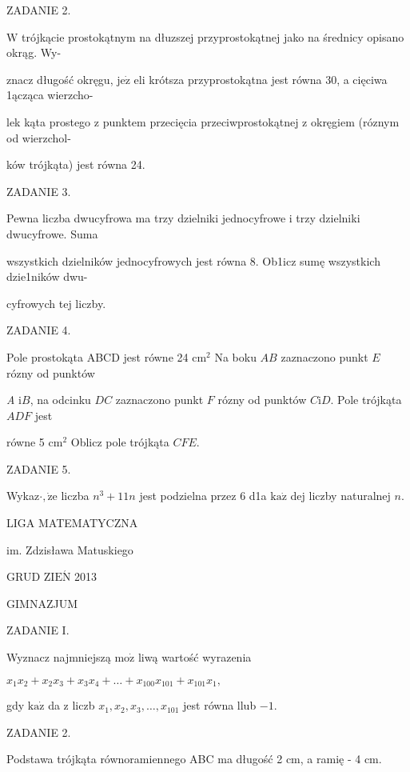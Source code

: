 \documentclass[a4paper,12pt]{article}
\begin{document}
ZADANIE 2.

$\mathrm{W}$ trójkącie prostokątnym na dłuzszej przyprostokątnej jako na średnicy opisano okrąg. Wy-

znacz długość okręgu, $\mathrm{j}\mathrm{e}\dot{\mathrm{z}}$ eli krótsza przyprostokątna jest równa 30, a cięciwa 1ącząca wierzcho-

lek kąta prostego z punktem przecięcia przeciwprostokątnej z okręgiem (róznym od wierzchol-

ków trójkąta) jest równa 24.

ZADANIE 3.

Pewna liczba dwucyfrowa ma trzy dzielniki jednocyfrowe i trzy dzielniki dwucyfrowe. Suma

wszystkich dzielników jednocyfrowych jest równa 8. Ob1icz sumę wszystkich dzie1ników dwu-

cyfrowych tej liczby.

ZADANIE 4.

Pole prostokąta ABCD jest równe 24 $\mathrm{c}\mathrm{m}^{2}$ Na boku $AB$ zaznaczono punkt $E$ rózny od punktów

{\it A} $\mathrm{i}B$, na odcinku $DC$ zaznaczono punkt $F$ rózny od punktów $C\mathrm{i}D$. Pole trójkąta $ADF$ jest

równe 5 $\mathrm{c}\mathrm{m}^{2}$ Oblicz pole trójkąta $CFE.$

ZADANIE 5.

Wykaz$\cdot, \dot{\mathrm{z}}\mathrm{e}$ liczba $n^{3}+11n$ jest podzielna przez 6 d1a $\mathrm{k}\mathrm{a}\dot{\mathrm{z}}$ dej liczby naturalnej $n.$






LIGA MATEMATYCZNA

im. Zdzisława Matuskiego

GRUD Z$\mathrm{I}\mathrm{E}\acute{\mathrm{N}}$ 2013

GIMNAZJUM

ZADANIE I.

Wyznacz najmniejszą $\mathrm{m}\mathrm{o}\dot{\mathrm{z}}$ liwą wartość wyrazenia

$x_{1}x_{2}+x_{2}x_{3}+x_{3}x_{4}+\ldots+x_{100}x_{101}+x_{101}x_{1},$

gdy $\mathrm{k}\mathrm{a}\dot{\mathrm{z}}$ da z liczb $x_{1}, x_{2}, x_{3}, \ldots, x_{101}$ jest równa llub $-1.$

ZADANIE 2.

Podstawa trójkąta równoramiennego ABC ma długość 2 cm, a ramię - 4 cm.
\end{document}
